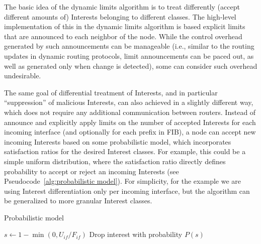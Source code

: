 
The basic idea of the dynamic limits algorithm is to treat differently (accept different amounts of) Interests belonging to different classes.
The high-level implementation of this in the dynamic limits algorithm is based explicit limits that are announced to each neighbor of the node.
While the control overhead generated by such announcements can be manageable (i.e., similar to the routing updates in dynamic routing protocols, limit announcements can be paced out, as well as generated only when change is detected), some can consider such overhead undesirable.

The same goal of differential treatment of Interests, and in particular ``suppression'' of malicious Interests, can also achieved in a slightly different way, which does not require any additional communication between routers.
Instead of announce and explicitly apply limits on the number of accepted Interests for each incoming interface (and optionally for each prefix in FIB), a node can accept new incoming Interests based on some probabilistic model, which incorporates satisfaction ratios for the desired Interest classes.
For example, this could be a simple uniform distribution, where the satisfaction ratio directly defines probability to accept or reject an incoming Interests (see Pseudocode~\ref{alg:probabilistic model}).
For simplicity, for the example we are using Interest differentiation only per incoming interface, but the algorithm can be generalized to more granular Interest classes.



\begin{algorithm}[h]
\caption{Probabilistic model}
\label{alg:probabilistic model}
\begin{algorithmic}[1]


    \State{} 
    \State{} 
    
         
            \State $s \leftarrow 1 - \min(0, U_{if} / F_{if})$
            \State Drop interest with probability $P(s)$
        \EndIf

    \EndFor
\EndFunction

\end{algorithmic}
\end{algorithm}

